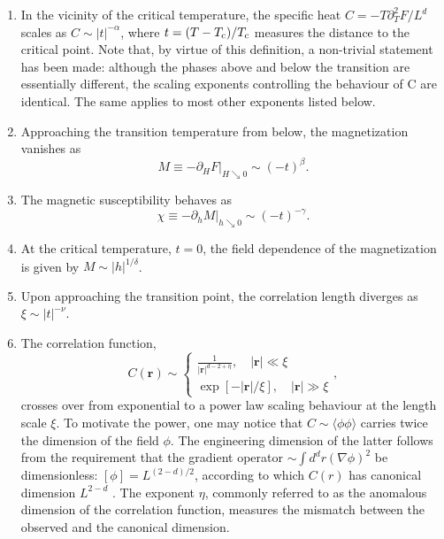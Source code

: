 \begin{enumerate}
\item In the vicinity of the critical temperature, the specific heat $C = -T\partial_T^2 F / L^d$ scales as $C \sim |t|^{-\alpha}$, where $t = (T-T_{\rm c})/T_{\rm c}$ measures the distance to the critical point.
Note that, by virtue of this definition, a non-trivial statement has been made: although the phases above and below the transition are essentially different, the scaling exponents controlling the behaviour of C are identical. The same applies to most other exponents listed below.
\item Approaching
the transition temperature from below, the magnetization vanishes as
\[M \equiv -\left. \partial_H F \right|_{H \searrow 0} \sim (-t)^{\beta} .\]
\item The magnetic susceptibility behaves as
\[\chi \equiv -\left. \partial_h M \right|_{h \searrow 0} \sim (-t)^{-\gamma} .\]
\item At the critical temperature, $t = 0$, the field dependence of the magnetization is given by $M \sim |h|^{1/\delta}$.
\item Upon approaching the transition point, the correlation length diverges as $\xi \sim |t|^{-\nu}$.
\item The correlation function,
\[C(\bm{r}) \sim \begin{cases} \frac{1}{|\bm{r}|^{d-2+\eta}} , \quad |\bm{r}| \ll \xi \\ \exp[-|\bm{r}|/\xi] , \quad |\bm{r}| \gg \xi  \end{cases} ,\]
crosses over from exponential to a power law scaling behaviour at the length scale $\xi$. 
To motivate the power, one may notice that $C \sim \langle \phi \phi \rangle$ carries twice the dimension of the field $\phi$. 
The engineering dimension of the latter follows from the requirement that the gradient operator $\sim \int d^dr (\nabla \phi)^2$ be dimensionless: $[\phi] = L^{(2-d)/2}$, according to which $C(r)$ has canonical dimension $L^{2-d}$ . 
The exponent $\eta$, commonly referred to as the anomalous dimension of the correlation function, measures the mismatch between the observed and the canonical dimension.
\end{enumerate}

